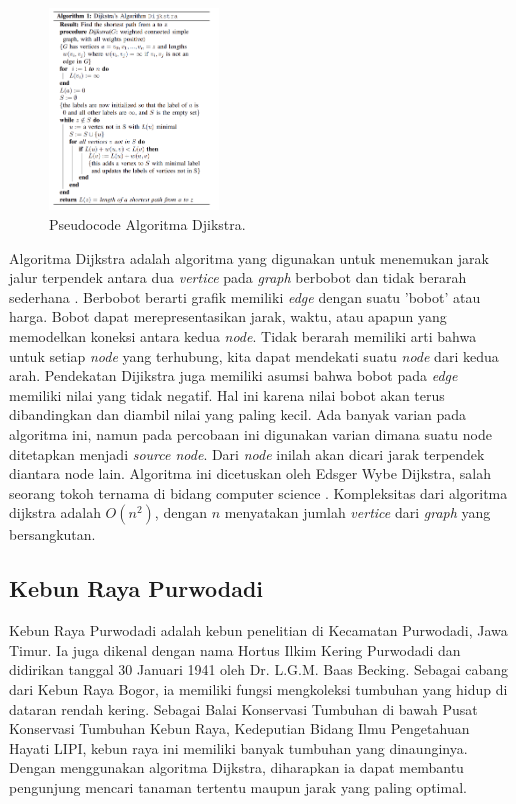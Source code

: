 \documentclass[conference]{IEEEtran}
\begin{document}
\begin{figure}[htbp]
    \centerline{\includegraphics[width=0.4\textwidth]{./sources/algoritma_djikstra.png}}
    \caption{Pseudocode Algoritma Djikstra.}
    \label{fig1}
\end{figure}

    Algoritma Dijkstra adalah algoritma yang digunakan untuk
    menemukan jarak jalur terpendek antara dua \textit{vertice} pada
    \textit{graph} berbobot dan tidak berarah sederhana \cite{koshy2004discrete}. Berbobot
    berarti grafik memiliki \textit{edge} dengan suatu 'bobot' atau harga.
    Bobot dapat merepresentasikan jarak, waktu, atau apapun
    yang memodelkan koneksi antara kedua \textit{node}. Tidak berarah
    memiliki arti bahwa untuk setiap \textit{node} yang terhubung, kita
    dapat mendekati suatu \textit{node} dari kedua arah. Pendekatan Dijikstra juga memiliki asumsi bahwa bobot pada \textit{edge} memiliki
    nilai yang tidak negatif. Hal ini karena nilai bobot akan
    terus dibandingkan dan diambil nilai yang paling kecil. Ada
    banyak varian pada algoritma ini, namun pada percobaan
    ini digunakan varian dimana suatu node ditetapkan menjadi
    \textit{source node}. Dari \textit{node} inilah akan dicari jarak terpendek
    diantara node lain. Algoritma ini dicetuskan oleh Edsger
    Wybe Dijkstra, salah seorang tokoh ternama di bidang computer science \cite{dijkstra1959note}. Kompleksitas dari algoritma dijkstra adalah $O(n^2)$,
    dengan $n$ menyatakan jumlah \textit{vertice} dari \textit{graph} yang
    bersangkutan.

\subsection{Kebun Raya Purwodadi}

    Kebun Raya Purwodadi adalah kebun penelitian di Kecamatan Purwodadi, Jawa Timur. Ia juga dikenal dengan nama
    Hortus Ilkim Kering Purwodadi dan didirikan tanggal 30 Januari 1941 oleh Dr. L.G.M. Baas Becking. Sebagai cabang dari
    Kebun Raya Bogor, ia memiliki fungsi mengkoleksi tumbuhan
    yang hidup di dataran rendah kering. Sebagai Balai Konservasi
    Tumbuhan di bawah Pusat Konservasi Tumbuhan Kebun Raya,
    Kedeputian Bidang Ilmu Pengetahuan Hayati LIPI, kebun raya
    ini memiliki banyak tumbuhan yang dinaunginya. Dengan
    menggunakan algoritma Dijkstra, diharapkan ia dapat membantu pengunjung mencari tanaman tertentu maupun jarak
    yang paling optimal.
\end{document}
